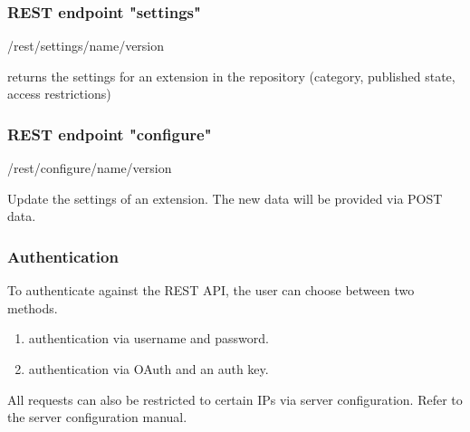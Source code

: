 
\subsubsection[sec:repository rest api endpoint settings]{REST endpoint "settings"}

/rest/settings/name/version

returns the settings for an extension in the repository (category, published state, access restrictions)

\subsubsection[sec:repository rest api endpoint configure]{REST endpoint "configure"}

/rest/configure/name/version

Update the settings of an extension. The new data will be provided via POST data.

\subsubsection[sec:repository rest api authentication]{Authentication}

To authenticate against the REST API, the user can choose between two methods.
\begin{enumerate}
\item authentication via username and password.
\item authentication via OAuth and an auth key.
\end{enumerate}

All requests can also be restricted to certain IPs via server configuration. Refer to the server configuration manual.
